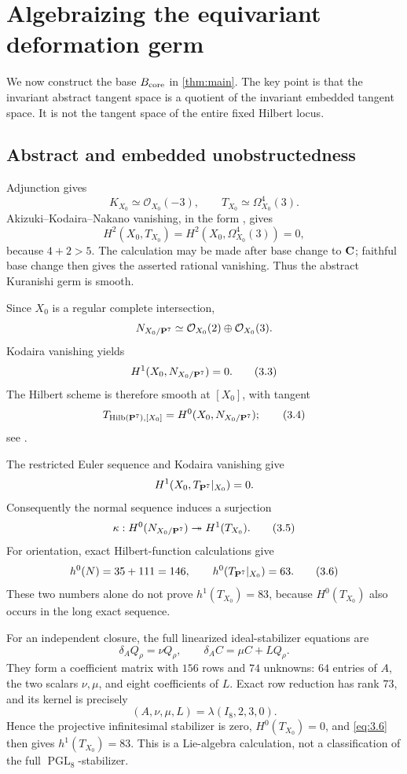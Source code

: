 \section{Algebraizing the equivariant deformation germ}
\label{sec:deformation}

We now construct the base \(B_{\mathrm{core}}\) in
\cref{thm:main}.  The key point is that the invariant abstract tangent space
is a quotient of the invariant embedded tangent space.  It is not the
tangent space of the entire fixed Hilbert locus.

\subsection{Abstract and embedded unobstructedness}

Adjunction gives
\[
 K_{X_0}\simeq\mathcal O_{X_0}(-3),\qquad
 T_{X_0}\simeq\Omega^4_{X_0}(3).                   \tag{3.1}
\]
Akizuki--Kodaira--Nakano vanishing, in the form
\cite[Theorem 4.11]{Demailly1994}, gives
\[
 H^2(X_0,T_{X_0})
 =H^2(X_0,\Omega^4_{X_0}(3))=0,                   \tag{3.2}
\]
because \(4+2>5\).  The calculation may be made after base change to
\(\mathbf C\); faithful base change then gives the asserted rational vanishing.
Thus the abstract Kuranishi germ is smooth.

Since \(X_0\) is a regular complete intersection,
\[
 N_{X_0/\mathbf P^7}
 \simeq\mathcal O_{X_0}(2)\oplus\mathcal O_{X_0}(3).
\]
Kodaira vanishing yields
\[
 H^1(X_0,N_{X_0/\mathbf P^7})=0.                         \tag{3.3}
\]
The Hilbert scheme is therefore smooth at \([X_0]\), with tangent
\[
 T_{\operatorname{Hilb}(\mathbf P^7),[X_0]}=H^0(X_0,N_{X_0/\mathbf P^7});
                                                               \tag{3.4}
\]
see \cite[Theorem 1.1(b),(c)]{Hartshorne2010}.

The restricted Euler sequence and Kodaira vanishing give
\[
 H^1(X_0,T_{\mathbf P^7}|_{X_0})=0.
\]
Consequently the normal sequence induces a surjection
\[
 \kappa:H^0(N_{X_0/\mathbf P^7})
 \twoheadrightarrow H^1(T_{X_0}).                  \tag{3.5}
\label{eq:3.5}
\]
For orientation, exact Hilbert-function calculations give
\[
 h^0(N)=35+111=146,\qquad
 h^0(T_{\mathbf P^7}|_{X_0})=63.                         \tag{3.6}
\label{eq:3.6}
\]
These two numbers alone do not prove \(h^1(T_{X_0})=83\), because
\(H^0(T_{X_0})\) also occurs in the long exact sequence.

For an independent closure, the full linearized ideal-stabilizer equations
are
\[
 \delta_AQ_\rho=\nu Q_\rho,\qquad
 \delta_AC=\mu C+LQ_\rho.                          \tag{3.7}
\]
They form a coefficient matrix with \(156\) rows and \(74\) unknowns:
\(64\) entries of \(A\), the two scalars \(\nu,\mu\), and eight
coefficients of \(L\).  Exact row reduction has rank \(73\), and its kernel
is precisely
\[
 (A,\nu,\mu,L)=\lambda(I_8,2,3,0).                 \tag{3.8}
\]
Hence the projective infinitesimal stabilizer is zero,
\(H^0(T_{X_0})=0\), and \cref{eq:3.6} then gives \(h^1(T_{X_0})=83\).
This is a Lie-algebra calculation, not a classification of the full
\(\operatorname{PGL}_8\)-stabilizer.

